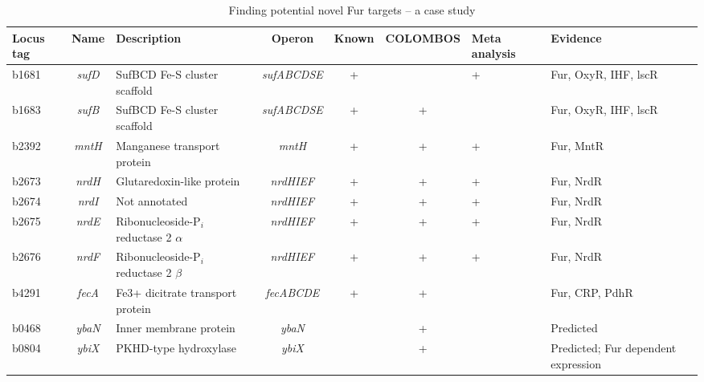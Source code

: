 \begin{sidewaystable}
\centering
\caption{Finding potential novel Fur targets – a case study}
\label{tab:colTB-case}
\begin{scriptsize}
\begin{tabular}{ l c >{\raggedright}p{4cm} c c c 
>{\centering\arraybackslash}p{1.2cm} >{\raggedright\arraybackslash}p{4cm} }
	\toprule
	\textbf{{\scriptsize Locus tag}} & \textbf{{\scriptsize Name}} & 
	\textbf{{\scriptsize Description}} & \textbf{{\scriptsize Operon}} & 
	\textbf{{\scriptsize Known}} & \textbf{{\scriptsize COLOMBOS}} & 
	\textbf{{\scriptsize Meta analysis}} & \textbf{{\scriptsize Evidence}} \\
	\midrule
	
	b1681 & \textit{sufD} & SufBCD Fe-S cluster scaffold & \textit{sufABCDSE} & 
	+ &		& + & Fur, OxyR, IHF, lscR \\[1ex]
	
	b1683 & \textit{sufB} & SufBCD Fe-S cluster scaffold & \textit{sufABCDSE} & 
	+ & + 	& 	& Fur, OxyR, IHF, lscR \\[1ex]
	
	b2392 & \textit{mntH} & Manganese transport protein & \textit{mntH} & 
	+ & + 	& + & Fur, MntR \\[1ex]
	
	b2673 & \textit{nrdH} & Glutaredoxin-like protein 	& \textit{nrdHIEF} &
	+ & + 	& + & Fur, NrdR \\[1ex]
	
	b2674 & \textit{nrdI} & Not annotated 				& \textit{nrdHIEF} & 
	+ & + 	& + & Fur, NrdR \\[1ex]
	
	b2675 & \textit{nrdE} & Ribonucleoside-P$_i$ reductase 2 $\alpha$ & 
	\textit{nrdHIEF} & 
	+ & + 	& + & Fur, NrdR \\[1ex]
	
	b2676 & \textit{nrdF} & Ribonucleoside-P$_i$ reductase 2 $\beta$ & 
	\textit{nrdHIEF} & 
	+ & + 	& + & Fur, NrdR \\[1ex]
	
	b4291 & \textit{fecA} & Fe3+ dicitrate transport protein & 
	\textit{fecABCDE} & 
	+ & + 	& 	& Fur, CRP, PdhR \\[1ex]
	
	b0468 & \textit{ybaN} & Inner membrane protein 		& \textit{ybaN} & 
	  & + 	& 	& Predicted \\[1ex]
	  
	b0804 & \textit{ybiX} & PKHD-type hydroxylase 		& \textit{ybiX} & 
	  & + 	& 	& Predicted; Fur dependent expression \\[1ex]
	  

\end{tabular}
\end{scriptsize}
\end{sidewaystable}
